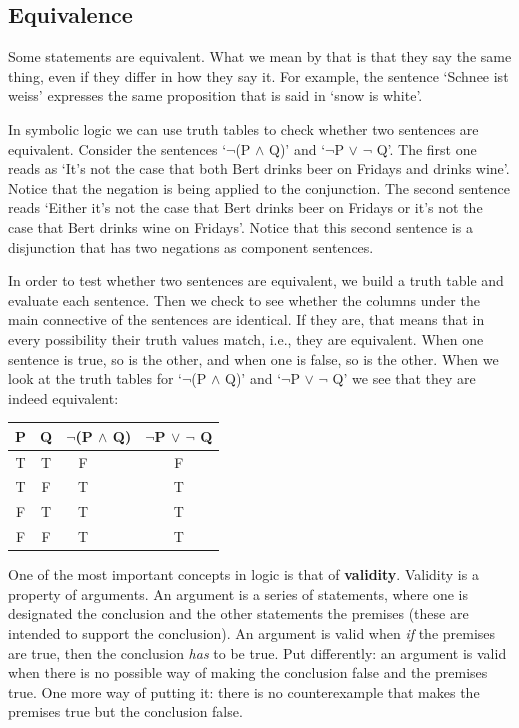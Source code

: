 \documentclass[]{tufte-book}
\begin{document}
\hypertarget{equivalence}{%
\subsection{Equivalence}\label{equivalence}}

Some statements are equivalent. What we mean by that is that they say the same thing, even if they differ in how they say it. For example, the sentence `Schnee ist weiss' expresses the same proposition that is said in `snow is white'.

In symbolic logic we can use truth tables to check whether two sentences are equivalent. Consider the sentences `\(\neg\)(P \(\wedge\) Q)' and `\(\neg\)P \(\vee\) \(\neg\) Q'. The first one reads as `It's not the case that both Bert drinks beer on Fridays and drinks wine'. Notice that the negation is being applied to the conjunction. The second sentence reads `Either it's not the case that Bert drinks beer on Fridays or it's not the case that Bert drinks wine on Fridays'. Notice that this second sentence is a disjunction that has two negations as component sentences.

In order to test whether two sentences are equivalent, we build a truth table and evaluate each sentence. Then we check to see whether the columns under the main connective of the sentences are identical. If they are, that means that in every possibility their truth values match, i.e., they are equivalent. When one sentence is true, so is the other, and when one is false, so is the other. When we look at the truth tables for `\(\neg\)(P \(\wedge\) Q)' and `\(\neg\)P \(\vee\) \(\neg\) Q' we see that they are indeed equivalent:

\begin{longtable}[]{@{}cccc@{}}
\toprule
P & Q & \(\neg\)(P \(\wedge\) Q) & \(\neg\)P \(\vee\) \(\neg\) Q\tabularnewline
\midrule
\endhead
T & T & F\(~~~~~~~~~~\) & F\tabularnewline
T & F & T\(~~~~~~~~~~\) & T\tabularnewline
F & T & T\(~~~~~~~~~~\) & T\tabularnewline
F & F & T\(~~~~~~~~~~\) & T\tabularnewline
\bottomrule
\end{longtable}

One of the most important concepts in logic is that of \textbf{validity}. Validity is a property of arguments. An argument is a series of statements, where one is designated the conclusion and the other statements the premises (these are intended to support the conclusion). An argument is valid when \emph{if} the premises are true, then the conclusion \emph{has} to be true. Put differently: an argument is valid when there is no possible way of making the conclusion false and the premises true. One more way of putting it: there is no counterexample that makes the premises true but the conclusion false.
\end{document}
